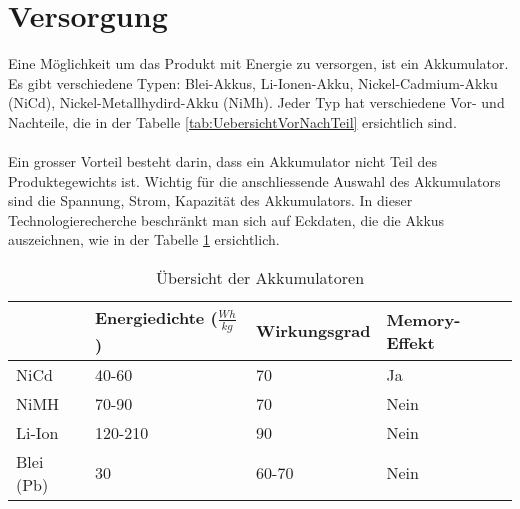 \section{Versorgung}
Eine Möglichkeit um das Produkt mit Energie zu versorgen, ist ein Akkumulator. Es gibt verschiedene Typen: Blei-Akkus, Li-Ionen-Akku, Nickel-Cadmium-Akku (NiCd), Nickel-Metallhydird-Akku (NiMh). Jeder Typ hat verschiedene Vor- und Nachteile, die in der Tabelle \ref{tab:UebersichtVorNachTeil} ersichtlich sind.\\
\\
Ein grosser Vorteil besteht darin, dass ein Akkumulator nicht Teil des Produktegewichts ist. Wichtig für die anschliessende Auswahl des Akkumulators sind die Spannung, Strom, Kapazität des Akkumulators. In dieser Technologierecherche beschränkt man sich auf Eckdaten, die die Akkus auszeichnen, wie in der Tabelle \ref{tab:UebersichtAkku} ersichtlich.\\ 

\begin{table}[h!]
	\begin{tabular}{|p{1.5cm}|p{3.4cm}|p{2.6cm}|p{2.8cm}|} \hline
		          &\textbf{Energiedichte} ($\frac{Wh}{kg}$)  & \textbf{Wirkungsgrad} & \textbf{Memory-Effekt}\\ \hline
		NiCd      & 40-60                                    & 70                    & Ja \\ \hline
		NiMH      & 70-90                                    & 70                    & Nein  \\ \hline
		Li-Ion    & 120-210                                  & 90                    & Nein \\ \hline
		Blei (Pb) & 30                                       & 60-70                 & Nein \\ \hline
	\end{tabular}
	\centering
	\caption{Übersicht der Akkumulatoren}
	\label{tab:UebersichtAkku} 
\end{table}

